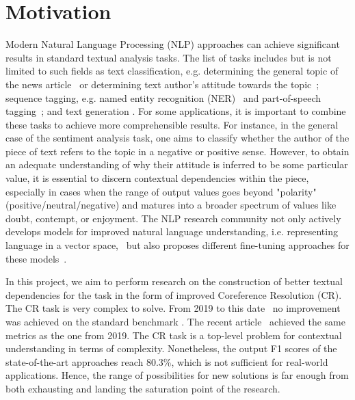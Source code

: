 
\section{Motivation}\label{sec:motication}

Modern Natural Language Processing (NLP) approaches can achieve significant results in standard textual analysis tasks. 
The list of tasks includes but is not limited to such fields as text classification, e.g. determining the general topic of the news article~\cite{text-classification-Altinel2018} or determining text author's attitude towards the topic~\cite{sentiment-analysis-Medhat2014}; sequence tagging,  e.g. named entity recognition (NER)~\cite{ner-Strakova2019,ner-Zhanming2019,ner-Yamada2020,ner-Luoma2020} and part-of-speech tagging~\cite{pos-tagging-Bohnet2018}; and text generation \cite{text-gen-Guo2017}. For some applications, it is important to combine these tasks to achieve more comprehensible results. 
For instance, in the general case of the sentiment analysis task, one aims to classify whether the author of the piece of text refers to the topic in a negative or positive sense. However, to obtain an adequate understanding of why their attitude is inferred to be some particular value, it is essential to discern contextual dependencies within the piece, especially in cases when the range of output values goes beyond "polarity" (positive/neutral/negative) and matures into a broader spectrum of values like doubt, contempt, or enjoyment. 
The NLP research community not only actively develops models for improved natural language understanding, i.e. representing language in a vector space,~\cite{gpt-Radford2018,bert-Devlin2019,xlnet-Yang2020} but also proposes different fine-tuning approaches for these models~\cite{robarta-Liu2019,cr-Joshi2019,gpt2-Radford2019,gpt3-Brown2020}. 

In this project, we aim to perform research on the construction of better textual dependencies for the task in the form of improved Coreference Resolution (CR). 
The CR task is very complex to solve. From 2019 to this date~\cite{cr-Joshi2019} no improvement was achieved on the standard benchmark \cite{ontonotes5-Weischedel2013}. 
The recent article~\cite{cr-Toshniwal2020} achieved the same metrics as the one from 2019. 
The CR task is a top-level problem for contextual understanding in terms of complexity. 
Nonetheless, the output F1 scores of the state-of-the-art approaches reach 80.3\%, which is not sufficient for real-world applications. 
Hence, the range of possibilities for new solutions is far enough from both exhausting and landing the saturation point of the research.

